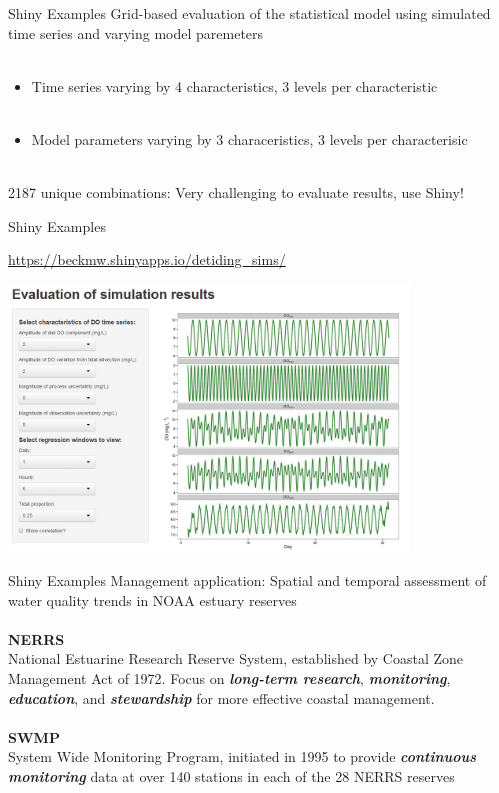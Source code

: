 \documentclass[serif]{beamer}\usepackage[]{graphicx}\usepackage[]{color}
\newcommand{\emtxt}[1]{\textbf{\textit{#1}}}
\begin{document}
\begin{frame}{Shiny Examples}
Grid-based evaluation of the statistical model using simulated time series and varying model paremeters \\~\\
\begin{itemize}
\item Time series varying by 4 characteristics, 3 levels per characteristic \\~\\
\item Model parameters varying by 3 characeristics, 3 levels per characterisic \\~\\
\end{itemize}
2187 unique combinations: Very challenging to evaluate results, use Shiny!
\end{frame}

\begin{frame}{Shiny Examples}
\centerline{\url{https://beckmw.shinyapps.io/detiding_sims/}}
\vspace{0.1in}
\centerline{\includegraphics[width = 0.8\textwidth]{fig/shinyex1.png}}
\end{frame}

\begin{frame}{Shiny Examples}
Management application: Spatial and temporal assessment of water quality trends in NOAA estuary reserves\\~\\
{\bf NERRS}\\
National Estuarine Research Reserve System, established by Coastal Zone Management Act of 1972. Focus on \emtxt{long-term research}, \emtxt{monitoring}, \emtxt{education}, and \emtxt{stewardship} for more effective coastal management.\\~\\
{\bf SWMP}\\
System Wide Monitoring Program, initiated in 1995 to provide \emtxt{continuous monitoring} data at over 140 stations in each of the 28 NERRS reserves \\~\\
\end{frame}
\end{document}

